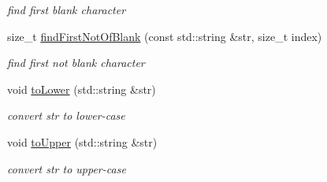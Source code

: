 \begin{DoxyCompactItemize}
\begin{DoxyCompactList}\small\item\em find first blank character \end{DoxyCompactList}\item 
\hypertarget{namespacesinsy_ac9ccffba31415cba48e3118101f13bcc}{size\-\_\-t \hyperlink{namespacesinsy_ac9ccffba31415cba48e3118101f13bcc}{find\-First\-Not\-Of\-Blank} (const std\-::string \&str, size\-\_\-t index)}\label{namespacesinsy_ac9ccffba31415cba48e3118101f13bcc}

\begin{DoxyCompactList}\small\item\em find first not blank character \end{DoxyCompactList}\item 
\hypertarget{namespacesinsy_a3d512d5839c7917260ce6164ebe1d3e4}{void \hyperlink{namespacesinsy_a3d512d5839c7917260ce6164ebe1d3e4}{to\-Lower} (std\-::string \&str)}\label{namespacesinsy_a3d512d5839c7917260ce6164ebe1d3e4}

\begin{DoxyCompactList}\small\item\em convert str to lower-\/case \end{DoxyCompactList}\item 
void \hyperlink{namespacesinsy_a938766384c5ad7696893b49a4302606f}{to\-Upper} (std\-::string \&str)
\begin{DoxyCompactList}\small\item\em convert str to upper-\/case \end{DoxyCompactList}\end{DoxyCompactItemize}
